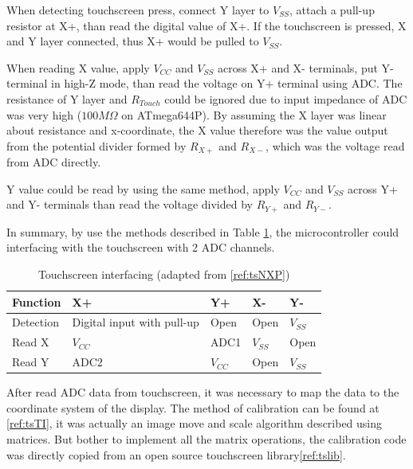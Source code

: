 \documentclass[a4paper,notitlepage,10pt]{report}
\newcommand{\sepTable}{\setlength{\intextsep}{12pt}}
\newcommand{\sepFigure}{\setlength{\intextsep}{10pt}}
\begin{document}
\begin{multicols}{2}
When detecting touchscreen press, connect Y layer to $V_{SS}$, attach a pull-up resistor at X+, than read the digital value of X+. If the touchscreen is pressed, X and Y layer connected, thus X+ would be pulled to $V_{SS}$.
\vspace{6pt}

When reading X value, apply $V_{CC}$ and $V_{SS}$ across X+ and X- terminals, put Y- terminal in high-Z mode, than read the voltage on Y+ terminal using ADC. The resistance of Y layer and $R_{Touch}$ could be ignored due to input impedance of ADC was very high ($100M\Omega$ on ATmega644P). By assuming the X layer was linear about resistance and x-coordinate, the X value therefore was the value output from the potential divider formed by $R_{X+}$ and $R_{X-}$, which was the voltage read from ADC directly.
\vspace{6pt}

Y value could be read by using the same method, apply $V_{CC}$ and $V_{SS}$ across Y+ and Y- terminals than read the voltage divided by $R_{Y+}$ and $R_{Y-}$.
\vspace{6pt}

In summary, by use the methods described in Table \ref{tb:ts}, the microcontroller could interfacing with the touchscreen with 2 ADC channels.
\vspace{6pt}

\sepTable
\begin{table}[H]
\caption{Touchscreen interfacing (adapted from \ref{ref:tsNXP})}
\label{tb:ts}
\begin{tabular}{p{} p{} p{} p{} p{}}
	\hline
	Function	& X+	& Y+	& X-	& Y- \\ \hline
	Detection	& Digital input with pull-up	& Open	& Open	& $V_{SS}$ \\ \hline
	Read X	& $V_{CC}$	& ADC1	& $V_{SS}$	& Open \\ \hline
	Read Y	& ADC2	& $V_{CC}$	& Open	& $V_{SS}$ \\ \hline
\end{tabular}
\end{table}
\sepFigure

After read ADC data from touchscreen, it was necessary to map the data to the coordinate system of the display. The method of calibration can be found at \ref{ref:tsTI}, it was actually an image move and scale algorithm described using matrices. But bother to implement all the matrix operations, the calibration code was directly copied from an open source touchscreen library\ref{ref:tslib}.
\vspace{6pt}


\end{multicols}
\end{document}
